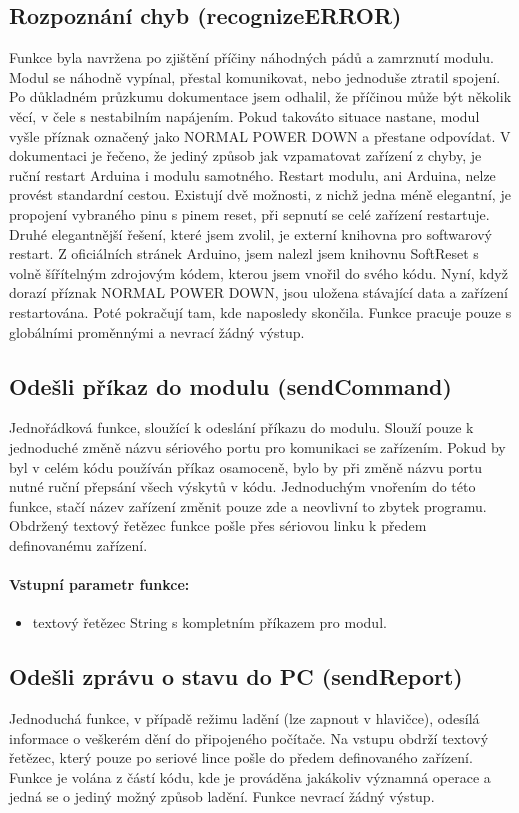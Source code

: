 \documentclass[FM,BP]{tulthesis}  %
\begin{document}
\subsection{Rozpoznání chyb (recognizeERROR)}
Funkce byla navržena po zjištění příčiny náhodných pádů a zamrznutí modulu. Modul se náhodně vypínal, přestal komunikovat, nebo jednoduše ztratil spojení. Po důkladném průzkumu dokumentace \cite{ROBOT SW} jsem odhalil, že příčinou může být několik věcí, v čele s nestabilním napájením. Pokud takováto situace nastane, modul vyšle příznak označený jako NORMAL POWER DOWN a přestane odpovídat. V dokumentaci je řečeno, že jediný způsob jak vzpamatovat zařízení z chyby, je ruční restart Arduina i modulu samotného. Restart modulu, ani Arduina, nelze provést standardní cestou. Existují dvě možnosti, z nichž jedna méně elegantní, je propojení vybraného pinu s pinem reset, při sepnutí se celé zařízení restartuje. Druhé elegantnější řešení, které jsem zvolil, je externí knihovna pro softwarový restart. Z oficiálních stránek Arduino, jsem nalezl jsem knihovnu SoftReset \cite{SoftReset} s volně šířítelným zdrojovým kódem, kterou jsem vnořil do svého kódu. Nyní, když dorazí příznak NORMAL POWER DOWN, jsou uložena stávající data a zařízení restartována. Poté pokračují tam, kde naposledy skončila. Funkce pracuje pouze s globálními proměnnými a nevrací žádný výstup.

\subsection{Odešli příkaz do modulu (sendCommand)}
Jednořádková funkce, sloužící k odeslání příkazu do modulu. Slouží pouze k jednoduché změně názvu sériového portu pro komunikaci se zařízením. Pokud by byl v celém kódu používán příkaz osamoceně, bylo by při změně názvu portu nutné ruční přepsání všech výskytů v kódu. Jednoduchým vnořením do této funkce, stačí název zařízení změnit pouze zde a neovlivní to zbytek programu. Obdržený textový řetězec funkce pošle přes sériovou linku k předem definovanému zařízení.

\paragraph{Vstupní parametr funkce:}
\begin{itemize}
\item textový řetězec String s kompletním příkazem pro modul.
\end{itemize}

\subsection{Odešli zprávu o stavu do PC (sendReport)}
Jednoduchá funkce, v případě režimu ladění (lze zapnout v hlavičce), odesílá informace o veškerém dění do připojeného počítače. Na vstupu obdrží textový řetězec, který pouze po seriové lince pošle do předem definovaného zařízení. Funkce je volána z částí kódu, kde je prováděna jakákoliv významná operace a jedná se o jediný možný způsob ladění. Funkce nevrací žádný výstup.
\end{document}
